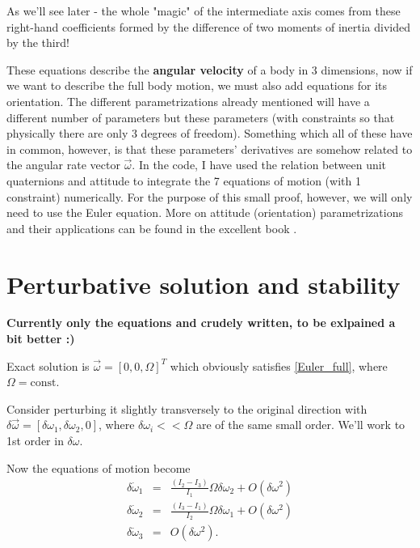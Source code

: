 \documentclass[a4paper]{article}
\begin{document}
	As we'll see later - the whole "magic" of the intermediate axis comes from these right-hand coefficients formed by the difference of two moments of inertia divided by the third!

	These equations describe the \textbf{angular velocity} of a body in 3 dimensions, now if we want to describe the full body motion, we must also add equations for its orientation.
	The different parametrizations already mentioned will have a different number of parameters but these parameters (with constraints so that physically there are only 3 degrees of freedom).
	Something which all of these have in common, however, is that these parameters' derivatives are somehow related to the angular rate vector $\vec{\omega}$.
	In the code, I have used the relation between unit quaternions and attitude to integrate the 7 equations of motion (with 1 constraint) numerically.
	For the purpose of this small proof, however, we will only need to use the Euler equation.
	More on attitude (orientation) parametrizations and their applications can be found in the excellent book \cite{ADCS_bible}.

	\section{Perturbative solution and stability}

	\textbf{Currently only the equations and crudely written, to be exlpained a bit better :)}

	Exact solution is $\vec{\omega} = [ 0 , 0 , \Omega ]^T$ which obviously satisfies \eqref{Euler_full}, where $\Omega = \mathrm{const}$.

	Consider perturbing it slightly transversely to the original direction with $\delta \vec{\omega} = [ \delta\omega_1 , \delta\omega_2 , 0 ]$, where $\delta\omega_i << \Omega$ are of the same small order.
	We'll work to 1st order in $\delta\omega$.

	Now the equations of motion become
	\begin{eqnarray}\label{Perturbed_Euler_1}
		\delta\dot{\omega}_1 & = & \frac{( I_2 - I_3 )}{I_1}\Omega \delta\omega_2 + O( \delta\omega^2 ) \\ \label{Perturbed_Euler_2}
		\delta\dot{\omega}_2 & = & \frac{( I_3 - I_1 )}{I_2}\Omega \delta\omega_1 + O( \delta\omega^2 ) \\ \label{Perturbed_Euler_3}
		\delta\dot{\omega}_3 & = & O( \delta\omega^2 ).
	\end{eqnarray}
\end{document}
